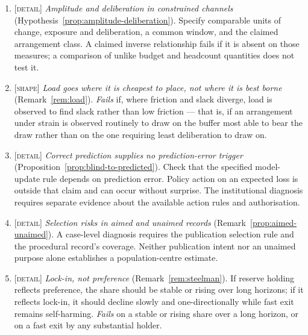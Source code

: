 \documentclass[11pt,a4paper]{article}
\theoremstyle{remark}
\begin{document}
\begin{enumerate}[leftmargin=2em]

\item \textsc{[detail]} \emph{Amplitude and deliberation in constrained channels}
(Hypothesis~\ref{prop:amplitude-deliberation}). Specify comparable units of
change, exposure and deliberation, a common window, and the claimed arrangement
class. A claimed inverse relationship fails if it is absent on those measures;
a comparison of unlike budget and headcount quantities does not test it.

\item \textsc{[shape]} \emph{Load goes where it is cheapest to place, not where it is best borne}
(Remark~\ref{rem:load}). \emph{Fails} if, where friction and slack diverge, load is observed to find
slack rather than low friction --- that is, if an arrangement under strain is observed routinely to draw
on the buffer most able to bear the draw rather than on the one requiring least deliberation to draw on.

\item \textsc{[detail]} \emph{Correct prediction supplies no prediction-error trigger}
(Proposition~\ref{prop:blind-to-predicted}). Check that the specified model-update
rule depends on prediction error. Policy action on an expected loss is outside
that claim and can occur without surprise. The institutional diagnosis requires
separate evidence about the available action rules and authorisation.

\item \textsc{[detail]} \emph{Selection risks in aimed and unaimed records}
(Remark~\ref{prop:aimed-unaimed}). A case-level diagnosis requires the publication
selection rule and the procedural record's coverage. Neither publication intent
nor an unaimed purpose alone establishes a population-centre estimate.

\item \textsc{[detail]} \emph{Lock-in, not preference} (Remark~\ref{rem:steelman}). If reserve holding
reflects preference, the share should be stable or rising over long horizons; if it reflects lock-in, it
should decline slowly and one-directionally while fast exit remains self-harming. \emph{Fails} on a
stable or rising share over a long horizon, or on a fast exit by any substantial holder.


\end{enumerate}
\end{document}
